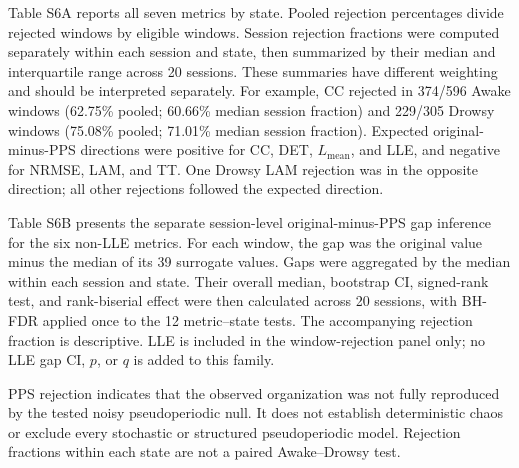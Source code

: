 Table S6A reports all seven metrics by state. Pooled rejection percentages divide rejected windows by eligible windows. Session rejection fractions were computed separately within each session and state, then summarized by their median and interquartile range across 20 sessions. These summaries have different weighting and should be interpreted separately. For example, CC rejected in 374/596 Awake windows (62.75\% pooled; 60.66\% median session fraction) and 229/305 Drowsy windows (75.08\% pooled; 71.01\% median session fraction). Expected original-minus-PPS directions were positive for CC, DET, $L_{\mathrm{mean}}$, and LLE, and negative for NRMSE, LAM, and TT. One Drowsy LAM rejection was in the opposite direction; all other rejections followed the expected direction.

Table S6B presents the separate session-level original-minus-PPS gap inference for the six non-LLE metrics. For each window, the gap was the original value minus the median of its 39 surrogate values. Gaps were aggregated by the median within each session and state. Their overall median, bootstrap CI, signed-rank test, and rank-biserial effect were then calculated across 20 sessions, with BH-FDR applied once to the 12 metric--state tests. The accompanying rejection fraction is descriptive. LLE is included in the window-rejection panel only; no LLE gap CI, $p$, or $q$ is added to this family.

PPS rejection indicates that the observed organization was not fully reproduced by the tested noisy pseudoperiodic null. It does not establish deterministic chaos or exclude every stochastic or structured pseudoperiodic model. Rejection fractions within each state are not a paired Awake--Drowsy test.

